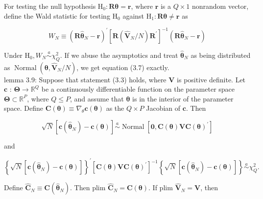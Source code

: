 \documentclass[10pt]{article}
\begin{document}
For testing the null hypothesis $\mathrm{H}_{0}: \mathbf{R} \boldsymbol{\theta}=\mathbf{r}$, where $\mathbf{r}$ is a $Q \times 1$ nonrandom vector, define the Wald statistic for testing $\mathrm{H}_{0}$ against $\mathrm{H}_{1}: \mathbf{R} \boldsymbol{\theta} \neq \mathbf{r}$ as


\begin{equation*}
W_{N} \equiv\left(\mathbf{R} \hat{\boldsymbol{\theta}}_{N}-\mathbf{r}\right)^{\prime}\left[\mathbf{R}\left(\hat{\mathbf{V}}_{N} / N\right) \mathbf{R}^{\prime}\right]^{-1}\left(\mathbf{R} \hat{\boldsymbol{\theta}}_{N}-\mathbf{r}\right) \tag{3.7}
\end{equation*}


Under $\mathrm{H}_{0}, W_{N} \stackrel{a}{\sim} \chi_{Q}^{2}$. If we abuse the asymptotics and treat $\hat{\boldsymbol{\theta}}_{N}$ as being distributed as $\operatorname{Normal}\left(\boldsymbol{\theta}, \hat{\mathbf{V}}_{N} / N\right)$, we get equation (3.7) exactly.\\
lemma 3.9: Suppose that statement (3.3) holds, where $\mathbf{V}$ is positive definite. Let $\mathbf{c}$ : $\boldsymbol{\Theta} \rightarrow \mathbb{R}^{Q}$ be a continuously differentiable function on the parameter space $\boldsymbol{\Theta} \subset \mathbb{R}^{P}$, where $Q \leq P$, and assume that $\boldsymbol{\theta}$ is in the interior of the parameter space. Define $\mathbf{C}(\boldsymbol{\theta}) \equiv \nabla_{\theta} \mathbf{c}(\boldsymbol{\theta})$ as the $Q \times P$ Jacobian of $\mathbf{c}$. Then


\begin{equation*}
\sqrt{N}\left[\mathbf{c}\left(\hat{\boldsymbol{\theta}}_{N}\right)-\mathbf{c}(\boldsymbol{\theta})\right] \stackrel{a}{\sim} \operatorname{Normal}\left[\mathbf{0}, \mathbf{C}(\boldsymbol{\theta}) \mathbf{V C}(\boldsymbol{\theta})^{\prime}\right] \tag{3.8}
\end{equation*}


and

$$
\left\{\sqrt{N}\left[\mathbf{c}\left(\hat{\boldsymbol{\theta}}_{N}\right)-\mathbf{c}(\boldsymbol{\theta})\right]\right\}^{\prime}\left[\mathbf{C}(\boldsymbol{\theta}) \mathbf{V C}(\boldsymbol{\theta})^{\prime}\right]^{-1}\left\{\sqrt{N}\left[\mathbf{c}\left(\hat{\boldsymbol{\theta}}_{N}\right)-\mathbf{c}(\boldsymbol{\theta})\right]\right\} \stackrel{a}{\sim} \chi_{Q}^{2} .
$$

Define $\hat{\mathbf{C}}_{N} \equiv \mathbf{C}\left(\hat{\boldsymbol{\theta}}_{N}\right)$. Then plim $\hat{\mathbf{C}}_{N}=\mathbf{C}(\boldsymbol{\theta})$. If plim $\hat{\mathbf{V}}_{N}=\mathbf{V}$, then
\end{document}
